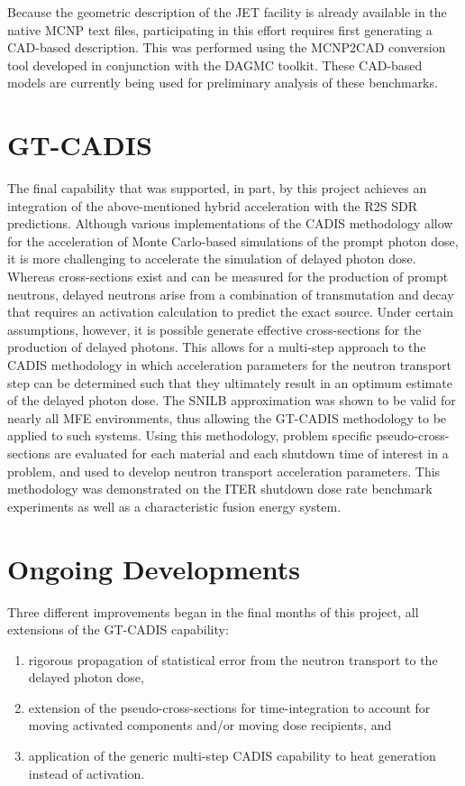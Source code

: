 Because the geometric description of the JET facility is already available in
the native MCNP text files, participating in this effort requires first
generating a \gls{CAD}-based description.  This was performed using the
MCNP2CAD conversion tool developed in conjunction with the \gls{DAGMC}
toolkit.  These \gls{CAD}-based models are currently being used for
preliminary analysis of these benchmarks.

\section{\acrfull{GT-CADIS}}

The final capability that was supported, in part, by this project achieves an
integration of the above-mentioned hybrid acceleration with the \gls{R2S}
\gls{SDR} predictions.  Although various implementations of the \gls{CADIS}
methodology allow for the acceleration of Monte Carlo-based simulations of the
prompt photon dose, it is more challenging to accelerate the simulation of
delayed photon dose.  Whereas cross-sections exist and can be measured for
the production of prompt neutrons, delayed neutrons arise from a combination
of transmutation and decay that requires an activation calculation to predict
the exact source.  Under certain assumptions, however, it is possible generate
effective cross-sections for the production of delayed photons.  This allows
for a multi-step approach to the \gls{CADIS} methodology in which acceleration
parameters for the neutron transport step can be determined such that they
ultimately result in an optimum estimate of the delayed photon dose.  The
\gls{SNILB} approximation was shown to be valid for nearly all \gls{MFE}
environments, thus allowing the \gls{GT-CADIS} methodology to be applied to
such systems.  Using this methodology, problem specific pseudo-cross-sections
are evaluated for each material and each shutdown time of interest in a
problem, and used to develop neutron transport acceleration parameters.  This
methodology was demonstrated on the ITER shutdown dose rate benchmark
experiments as well as a characteristic fusion energy
system.

\section{Ongoing Developments}

Three different improvements began in the final months of this project, all
extensions of the \gls{GT-CADIS} capability:
\begin{enumerate}
\item rigorous propagation of statistical error from the neutron transport to
  the delayed photon dose,
\item extension of the pseudo-cross-sections for time-integration to account
  for moving activated components and/or moving dose recipients, and
\item application of the generic multi-step \gls{CADIS} capability to heat
  generation instead of activation.
\end{enumerate} 
